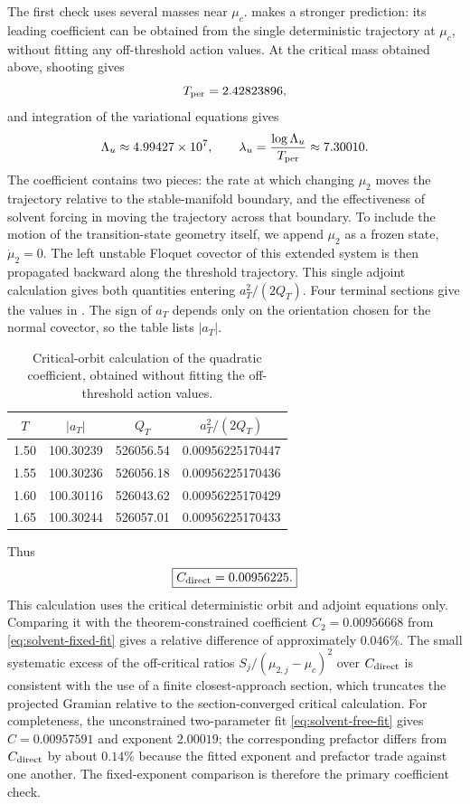 \documentclass[11pt]{article}
\theoremstyle{definition}
\theoremstyle{remark}
\begin{document}
The first check uses several masses near $\mu_c$.   makes a stronger prediction: its leading coefficient can be obtained from the single deterministic trajectory at $\mu_c$, without fitting any off-threshold action values.  At the critical mass obtained above, shooting gives
\begin{equation}
T_{\rm per}=2.42823896,
\end{equation}
and integration of the variational equations gives
\begin{equation}
\Lambda_u\approx4.99427\times10^7,
\qquad
\lambda_u=\frac{\log\Lambda_u}{T_{\rm per}}\approx7.30010.
\label{eq:critical-floquet}
\end{equation}
The coefficient contains two pieces: the rate at which changing $\mu_2$ moves the trajectory relative to the stable-manifold boundary, and the effectiveness of solvent forcing in moving the trajectory across that boundary.  To include the motion of the transition-state geometry itself, we append $\mu_2$ as a frozen state, $\dot\mu_2=0$.  The left unstable Floquet covector of this extended system is then propagated backward along the threshold trajectory.  This single adjoint calculation gives both quantities entering $a_T^2/(2Q_T)$.  Four terminal sections give the values in .  The sign of $a_T$ depends only on the orientation chosen for the normal covector, so the table lists $|a_T|$.
\begin{table}[htbp]
\centering
\caption{Critical-orbit calculation of the quadratic coefficient, obtained without fitting the off-threshold action values.}
\label{tab:critical-coefficient}
\begin{tabular}{cccc}
\toprule
$T$ & $|a_T|$ & $Q_T$ & $a_T^2/(2Q_T)$\\
\midrule
1.50 & 100.30239 & 526056.54 & 0.00956225170447\\
1.55 & 100.30236 & 526056.18 & 0.00956225170436\\
1.60 & 100.30116 & 526043.62 & 0.00956225170429\\
1.65 & 100.30244 & 526057.01 & 0.00956225170433\\
\bottomrule
\end{tabular}
\end{table}
Thus
\begin{equation}
\boxed{C_{\rm direct}=0.00956225.}
\label{eq:C-direct}
\end{equation}
This calculation uses the critical deterministic orbit and adjoint equations only.  Comparing it with the theorem-constrained coefficient $C_2=0.00956668$ from \eqref{eq:solvent-fixed-fit} gives a relative difference of approximately $0.046\%$.  The small systematic excess of the off-critical ratios $S_j/(\mu_{2,j}-\mu_c)^2$ over $C_{\rm direct}$ is consistent with the use of a finite closest-approach section, which truncates the projected Gramian relative to the section-converged critical calculation.  For completeness, the unconstrained two-parameter fit \eqref{eq:solvent-free-fit} gives $C=0.00957591$ and exponent $2.00019$; the corresponding prefactor differs from $C_{\rm direct}$ by about $0.14\%$ because the fitted exponent and prefactor trade against one another.  The fixed-exponent comparison is therefore the primary coefficient check.
\end{document}
